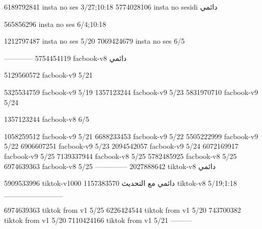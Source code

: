 
6189792841 insta no ses
3/27;10:18
5774028106 insta no sesidi
دائمي


565856296 insta no ses
6/4;10:18


1212797487 insta no ses
5/20
7069424679 insta no ses
6/5

------------
5754454119 facbook-v8
دائمي

5129560572 facbook-v9
5/21

5325534759 facbook-v9
5/19
1357123244 facbook-v9
5/23
5831970710 facbook-v9
5/24

1357123244 facbook-v8
6/5

1058259512 facbook-v9
5/21
6688233453 facbook-v9
5/22
5505222999 facbook-v9
5/22
6906607251 facbook-v9
5/23
2094542057 facbook-v9
5/24
6072169917 facbook-v9
5/25
7139337944 facbook-v8
5/25
5782485925 facbook-v8
5/25
6974639363 facbook-v8
5/25
--------------
2027888642 tiktok-v8
دائمي

5909533996 tiktok-v1000
دائمي مع التحديث
1157383570 tiktok-v8
5/19;1:18
___________

6974639363 tiktok from v1
5/25
6226424544 tiktok from v1
5/20
743700382 tiktok from v1
5/20
7110424166 tiktok from v1
5/21
---------
